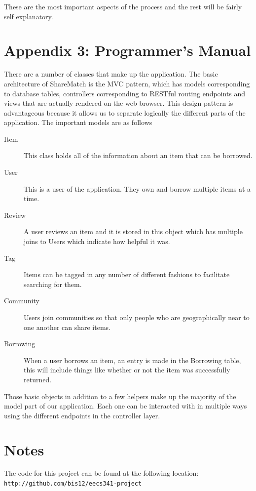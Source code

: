 \documentclass{acm_proc_article-sp}
\begin{document}
These are the most important aspects of the process and the rest will be fairly self explanatory.
\section{Appendix 3: Programmer's Manual}
There are a number of classes that make up the application.  The basic architecture of ShareMatch is the MVC pattern, which has models corresponding to database tables, controllers corresponding to RESTful routing endpoints and views that are actually rendered on the web browser.  This design pattern is advantageous because it allows us to separate logically the different parts of the application.  The important models are as follows

\begin{description}
\item[Item] This class holds all of the information about an item that can be borrowed.
\item[User] This is a user of the application. They own and borrow multiple items at a time.
\item[Review] A user reviews an item and it is stored in this object which has multiple joins to Users which indicate how helpful it was.
\item[Tag] Items can be tagged in any number of different fashions to facilitate searching for them.
\item[Community] Users join communities so that only people who are geographically near to one another can share items.
\item[Borrowing]  When a user borrows an item, an entry is made in the Borrowing table, this will include things like whether or not the item was successfully returned.
\end{description}

Those basic objects in addition to a few helpers make up the majority of the model part of our application.  Each one can be interacted with in multiple ways using the different endpoints in the controller layer.


\section*{Notes}
The code for this project can be found at the following location:\\
\texttt{http://github.com/bis12/eecs341-project}
\end{document}
